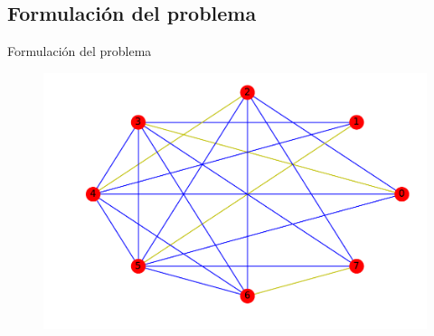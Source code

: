 \documentclass{beamer}
\begin{document}
\subsection{Formulación del problema}
\begin{frame}{Formulación del problema}
\begin{figure}[h!]
\includegraphics[scale=0.45]{opt2}
\end{figure}
\end{frame}
\end{document}
